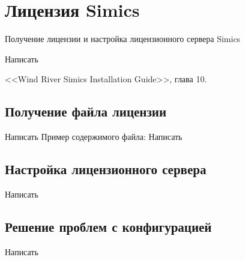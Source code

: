 \section{Лицензия Simics}{Получение лицензии и настройка лицензионного сервера Simics}

\todo Написать

<<Wind River Simics Installation Guide>>, глава 10. 

\subsection{Получение файла лицензии}

\todo Написать
Пример содержимого файла:
\todo Написать

\subsection{Настройка лицензионного сервера}
\todo Написать

\subsection{Решение проблем с конфигурацией}
\todo Написать



